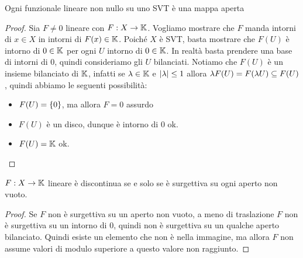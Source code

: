 \begin{lemma}\label{LmFunzionaleLineareNonNulloSuSVTMappaAperta}
    Ogni funzionale lineare non nullo su uno SVT \`e una mappa aperta
\end{lemma}
\begin{proof}
Sia $F\neq0$ lineare con $F:X\to \mathbb{K}$. Vogliamo mostrare che $F$ manda intorni di $x\in X$ in intorni di $F(x)\in\mathbb{K}$. Poich\'e $X$ \`e SVT, basta mostrare che $F(U)$ \`e intorno di $0\in\mathbb{K}$ per ogni $U$ intorno di $0\in \mathbb{K}$. In realt\`a basta prendere una base di intorni di $0$, quindi consideriamo gli $U$ bilanciati. Notiamo che $F(U)$ \`e un insieme bilanciato di $\mathbb{K}$, infatti se $\lambda\in\mathbb{K}$ e $\left|{\lambda}\right|\leq 1$ allora $\lambda F(U)=F(\lambda U)\subseteq F(U)$, quindi abbiamo le seguenti possibilit\`a:
\begin{itemize}
    \item $F(U)=\left\{{0}\right\}$, ma allora $F=0$ assurdo
    \item $F(U)$ \`e un disco, dunque \`e intorno di $0$ ok.
    \item $F(U)=\mathbb{K}$ ok. 
\end{itemize}
\end{proof}
\begin{corollary}\label{CorDiscontinuitaFunzionaliLineari}
$F:X\to \mathbb{K}$ lineare \`e discontinua se e solo se \`e surgettiva su ogni aperto non vuoto.
\end{corollary}
\begin{proof}
Se $F$ non \`e surgettiva su un aperto non vuoto, a meno di traslazione $F$ non \`e surgettiva su un intorno di $0$, quindi non \`e surgettiva su un qualche aperto bilanciato. Quindi esiste un elemento che non \`e nella immagine, ma allora $F$ non assume valori di modulo superiore a questo valore non raggiunto.
\end{proof}


